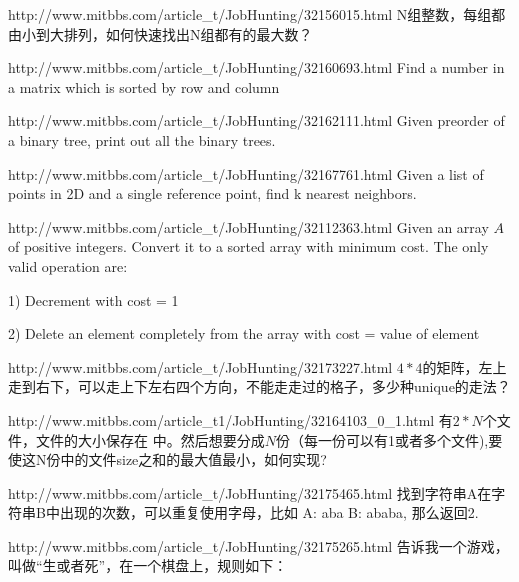 \documentclass[a4paper]{article}
\newcommand{\ilcode}[1]{
	\framebox[\width]{\texttt{#1}}
}
\begin{document}
\begin{CJK}{UTF8}{gbsn}
\begin{enumerate}
\begin{Q}{http://www.mitbbs.com/article_t/JobHunting/32156015.html}
N组整数，每组都由小到大排列，如何快速找出N组都有的最大数？
\end{Q}

\begin{Q}[Linkedln]{http://www.mitbbs.com/article_t/JobHunting/32160693.html}
Find a number in a matrix which is sorted by row and column
\end{Q}

\begin{Q}[Facebook]{http://www.mitbbs.com/article_t/JobHunting/32162111.html}
Given preorder of a binary tree, print out all the binary trees.
\end{Q}

\begin{Q}[Amazon]{http://www.mitbbs.com/article_t/JobHunting/32167761.html}
Given a list of points in 2D and a single reference point, find k nearest neighbors.
\end{Q}

\begin{Q}[Facebook]{http://www.mitbbs.com/article_t/JobHunting/32112363.html}
Given an array $A$ of positive integers. Convert it to a sorted array with minimum cost. The only valid operation are:

1) Decrement with cost = 1

2) Delete an element completely from the array with cost = value of element
\end{Q}

\begin{Q}{http://www.mitbbs.com/article_t/JobHunting/32173227.html}
$4 * 4$的矩阵，左上走到右下，可以走上下左右四个方向，不能走走过的格子，多少种unique的走法？
\end{Q}

\begin{Q}[Microsoft]{http://www.mitbbs.com/article_t1/JobHunting/32164103_0_1.html}
有$2*N$个文件，文件的大小保存在\ilcode{size[2*N]}中。然后想要分成$N$份（每一份可以有1或者多个文件),要使这N份中的文件size之和的最大值最小，如何实现?
\end{Q}

\begin{Q}[Google]{http://www.mitbbs.com/article_t/JobHunting/32175465.html}
找到字符串A在字符串B中出现的次数，可以重复使用字母，比如 A: aba  B: ababa, 那么返回2.
\end{Q}

\begin{Q}[Google]{http://www.mitbbs.com/article_t/JobHunting/32175265.html}
告诉我一个游戏，叫做“生或者死”，在一个棋盘上，规则如下：


\end{Q}
\end{enumerate}
\end{CJK}
\end{document}
